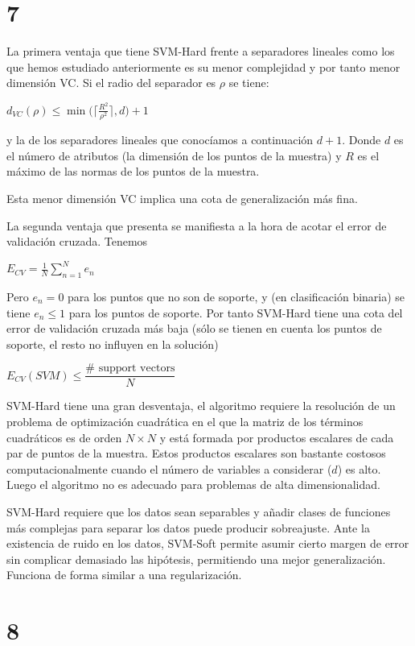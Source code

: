 \documentclass{article}
\begin{document}
\section{7}

La primera ventaja que tiene SVM-Hard frente a separadores lineales
como los que hemos estudiado anteriormente es su menor complejidad y
por tanto menor dimensión VC. Si el radio del separador es \(\rho\) se
tiene:

\(d_{VC}(\rho)\leq\min\bigg(\Big\lceil\frac{R^2}{\rho^2}\Big\rceil,d\bigg)+1\)

y la de los separadores lineales que conocíamos a continuación
\(d+1\).  Donde \(d\) es el número de atributos (la dimensión de los
puntos de la muestra) y \(R\) es el máximo de las normas de los puntos
de la muestra.

Esta menor dimensión VC implica una cota de generalización más fina.

La segunda ventaja que presenta se manifiesta a la hora de acotar el
error de validación cruzada. Tenemos

\(E_{CV}=\frac{1}{N}\sum\limits_{n=1}^N e_n\)

Pero \(e_n=0\) para los puntos que no son de soporte, y (en
clasificación binaria) se tiene \(e_n\leq 1\) para los puntos de
soporte. Por tanto SVM-Hard tiene una cota del error de validación
cruzada más baja (sólo se tienen en cuenta los puntos de soporte, el
resto no influyen en la solución)

\(E_{CV}(SVM)\leq\dfrac{\# \text{ support vectors}}{N}\)

SVM-Hard tiene una gran desventaja, el algoritmo requiere la
resolución de un problema de optimización cuadrática en el que la
matriz de los términos cuadráticos es de orden \(N\times N\) y está
formada por productos escalares de cada par de puntos de la
muestra. Estos productos escalares son bastante costosos
computacionalmente cuando el número de variables a considerar (\(d\))
es alto. Luego el algoritmo no es adecuado para problemas de alta
dimensionalidad.

SVM-Hard requiere que los datos sean separables y añadir clases de
funciones más complejas para separar los datos puede producir
sobreajuste. Ante la existencia de ruido en los datos, SVM-Soft
permite asumir cierto margen de error sin complicar demasiado las
hipótesis, permitiendo una mejor generalización. Funciona de forma
similar a una regularización.

\section{8}
\end{document}
